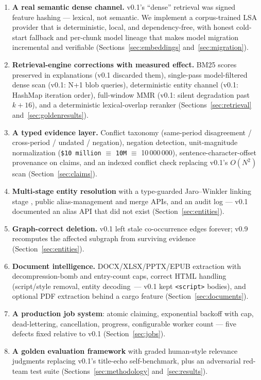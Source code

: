 \begin{enumerate}[itemsep=2pt]
\item \textbf{A real semantic dense channel.} v0.1's ``dense'' retrieval was
signed feature hashing --- lexical, not semantic. We implement a corpus-trained
LSA provider \cite{deerwester1990,halko2011} that is deterministic, local, and
dependency-free, with honest cold-start fallback and per-chunk model lineage
that makes model migration incremental and verifiable
(Sections~\ref{sec:embeddings} and~\ref{sec:migration}).
\item \textbf{Retrieval-engine corrections with measured effect.} BM25 scores
preserved in explanations (v0.1 discarded them), single-pass model-filtered
dense scan (v0.1: N+1 blob queries), deterministic entity channel (v0.1:
HashMap iteration order), full-window MMR (v0.1: silent degradation past
$k+16$), and a deterministic lexical-overlap reranker
(Sections~\ref{sec:retrieval} and~\ref{sec:goldenresults}).
\item \textbf{A typed evidence layer.} Conflict taxonomy (same-period
disagreement / cross-period / undated / negation), negation detection,
unit-magnitude normalization (\texttt{\$10 million} $\equiv$ \texttt{10M}
$\equiv$ 10\,000\,000), sentence-character-offset provenance on claims, and an
indexed conflict check replacing v0.1's $O(N^2)$ scan
(Section~\ref{sec:claims}).
\item \textbf{Multi-stage entity resolution} with a type-guarded
Jaro--Winkler linking stage \cite{winkler1989}, public alias-management and
merge APIs, and an audit log --- v0.1 documented an alias API that did not
exist (Section~\ref{sec:entities}).
\item \textbf{Graph-correct deletion.} v0.1 left stale co-occurrence edges
forever; v0.9 recomputes the affected subgraph from surviving evidence
(Section~\ref{sec:entities}).
\item \textbf{Document intelligence.} DOCX/XLSX/PPTX/EPUB extraction with
decompression-bomb and entry-count caps, correct HTML handling (script/style
removal, entity decoding~--- v0.1 kept \texttt{<script>} bodies), and optional
PDF extraction behind a cargo feature (Section~\ref{sec:documents}).
\item \textbf{A production job system}: atomic claiming, exponential backoff
with cap, dead-lettering, cancellation, progress, configurable worker count ---
five defects fixed relative to v0.1 (Section~\ref{sec:jobs}).
\item \textbf{A golden evaluation framework} with graded human-style relevance
judgments replacing v0.1's title-echo self-benchmark, plus an adversarial
red-team test suite (Sections~\ref{sec:methodology} and~\ref{sec:results}).
\end{enumerate}

